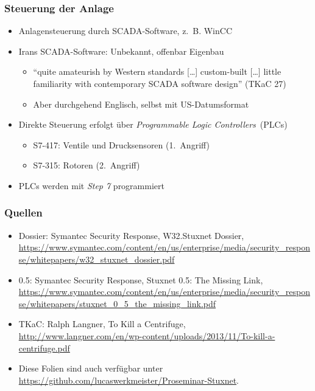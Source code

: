 \documentclass{beamer}
\begin{document}
\begin{frame}
  \frametitle{Steuerung der Anlage}
  \begin{itemize}
    \item Anlagensteuerung durch SCADA-Software, z.~B. WinCC
    \item Irans SCADA-Software: Unbekannt, offenbar Eigenbau
      \begin{itemize}
        \item ``quite amateurish by Western standards […] custom-built […] little familiarity with contemporary SCADA software design'' (TKaC 27)
        \item Aber durchgehend Englisch, selbst mit US-Datumsformat
      \end{itemize}
    \item Direkte Steuerung erfolgt über \emph{Programmable Logic Controllers}~(PLCs)
      \begin{itemize}
        \item S7-417: Ventile und Drucksensoren (1.~Angriff)
        \item S7-315: Rotoren (2.~Angriff)
      \end{itemize}
    \item PLCs werden mit \emph{Step 7} programmiert
  \end{itemize}
\end{frame}



\begin{frame}
  \frametitle{Quellen}
  \fontsize{6pt}{7.2}\selectfont
  \begin{itemize}
    \item Dossier: Symantec Security Response, W32.Stuxnet Dossier, \url{https://www.symantec.com/content/en/us/enterprise/media/security_response/whitepapers/w32_stuxnet_dossier.pdf}
    \item 0.5: Symantec Security Response, Stuxnet 0.5: The Missing Link, \url{https://www.symantec.com/content/en/us/enterprise/media/security_response/whitepapers/stuxnet_0_5_the_missing_link.pdf}
    \item TKaC: Ralph Langner, To Kill a Centrifuge, \url{http://www.langner.com/en/wp-content/uploads/2013/11/To-kill-a-centrifuge.pdf}
    \item Diese Folien sind auch verfügbar unter \url{https://github.com/lucaswerkmeister/Proseminar-Stuxnet}.
  \end{itemize}
\end{frame}

\immediate\closeout\notesfile
\end{document}
